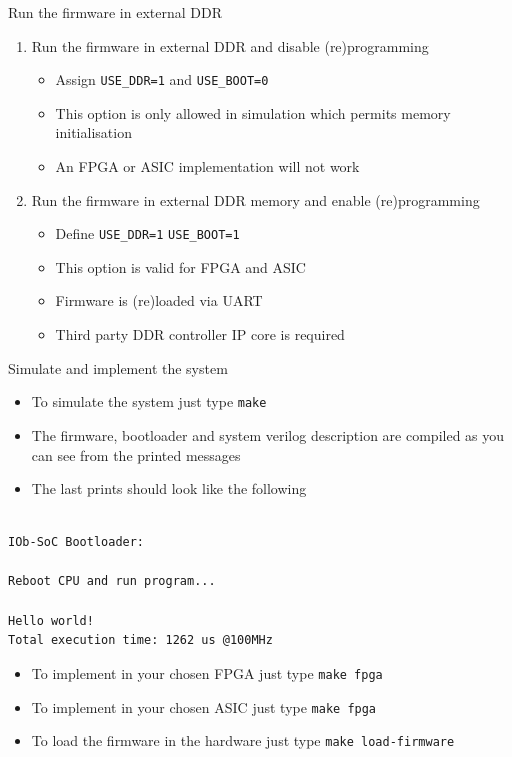 \documentclass [xcolor=svgnames, t] {beamer}
\begin{document}
\begin{frame}{Run the firmware in external DDR}
\begin{enumerate}
\item Run the firmware in external DDR and disable (re)programming
  \begin{itemize}
  \item Assign {\tt USE\_DDR=1} and {\tt USE\_BOOT=0}
  \item This option is only allowed in simulation which permits memory initialisation
  \item An FPGA or ASIC implementation will not work
  \end{itemize}
\item Run the firmware in external DDR memory and enable (re)programming
  \begin{itemize}
  \item Define {\tt USE\_DDR=1} {\tt USE\_BOOT=1}
  \item This option is valid for FPGA and ASIC
  \item Firmware is (re)loaded via UART
  \item Third party DDR controller IP core is required
  \end{itemize}
\end{enumerate}
\end{frame}

\begin{frame}[fragile]{Simulate and implement the system}

\begin{itemize}
\item To simulate the system just type {\tt make} 
\item The firmware, bootloader and system verilog description are compiled as you can see from the printed messages
\item The last prints should look like the following
\end{itemize}

\begin{tiny}
\begin{lstlisting}

IOb-SoC Bootloader:

Reboot CPU and run program...

Hello world!
Total execution time: 1262 us @100MHz
\end{lstlisting}
\end{tiny}

\begin{itemize}
\item To implement in your chosen FPGA just type {\tt make fpga}
\item To implement in your chosen ASIC just type {\tt make fpga}
\item To load the firmware in the hardware just type {\tt make load-firmware}
\end{itemize}

\end{frame}
\end{document}
